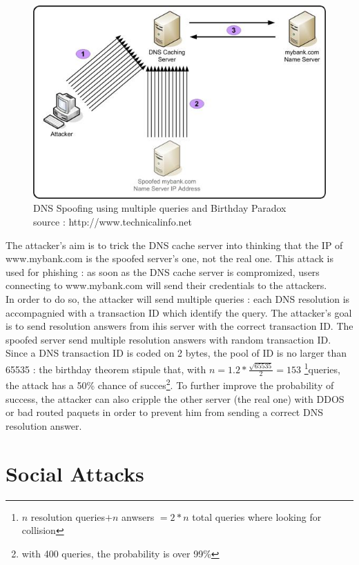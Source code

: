 \begin{figure}[ht!]
    \centering
       \includegraphics[width=\textwidth]{images/dns_spoofing_birthday.jpg}
	\caption{DNS Spoofing using multiple queries and Birthday Paradox \\ source : http://www.technicalinfo.net}
	\label{fig:DNSSpoofingBirthday}
\end{figure}

The attacker's aim is to trick the DNS cache server into thinking that the IP of www.mybank.com is the spoofed server's one, not the real one. This attack is used for phishing : as soon as the DNS cache server is compromized, users connecting to www.mybank.com will send their credentials to the attackers. \\
In order to do so, the attacker will send multiple queries : each DNS resolution is accompagnied with a transaction ID which identify the query. The attacker's goal is to send resolution answers from ihis server with the correct transaction ID. The spoofed server send multiple resolution answers with random transaction ID. Since a DNS transaction ID is coded on 2 bytes, the pool of ID is no larger than 65535 : the birthday theorem stipule that, with $n = 1.2 * \frac{\sqrt{65535}}{2}  = 153$  \footnote{ $n$ resolution queries$ + n$ anwsers $= 2*n$ total queries where looking for collision }queries, the attack has a 50\% chance of succes\footnote{with 400 queries, the probability is over 99\%}. To further improve the probability of success, the attacker can also cripple the other server (the real one) with DDOS or bad routed paquets in order to prevent him from sending a correct DNS resolution answer.

\section{Social Attacks}

